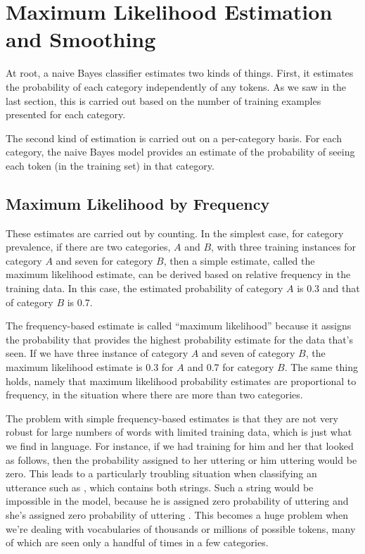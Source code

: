 \section{Maximum Likelihood Estimation and Smoothing}

At root, a naive Bayes classifier estimates two kinds of things.  First,
it estimates the probability of each category independently of any
tokens.  As we saw in the last section, this is carried out based on
the number of training examples presented for each category.

The second kind of estimation is carried out on a per-category basis.
For each category, the naive Bayes model provides an estimate of the
probability of seeing each token (in the training set) in that
category.

\subsection{Maximum Likelihood by Frequency}

These estimates are carried out by counting.  In the simplest case,
for category prevalence, if there are two categories, $A$ and $B$,
with three training instances for category $A$ and seven for category
$B$, then a simple estimate, called the maximum likelihood estimate,
can be derived based on relative frequency in the training data.  In
this case, the estimated probability of category $A$ is 0.3 and that
of category $B$ is 0.7.

The frequency-based estimate is called ``maximum likelihood'' because
it assigns the probability that provides the highest probability
estimate for the data that's seen.  If we have three instance of
category $A$ and seven of category $B$, the maximum likelihood
estimate is 0.3 for $A$ and 0.7 for category $B$.  The same thing
holds, namely that maximum likelihood probability estimates are
proportional to frequency, in the situation where there are more than
two categories.

The problem with simple frequency-based estimates is that they are not
very robust for large numbers of words with limited training data,
which is just what we find in language.  For instance, if we had
training for him and her that looked as follows,
%
%
then the probability assigned to her uttering  or
him uttering  would be zero.  This leads to a
particularly troubling situation when classifying an utterance such as
, which contains both strings.  Such a
string would be impossible in the model, because he is assigned zero
probability of uttering  and she's assigned zero
probability of uttering .  This becomes a huge problem
when we're dealing with vocabularies of thousands or millions of 
possible tokens, many of which are seen only a handful of times in
a few categories.  

